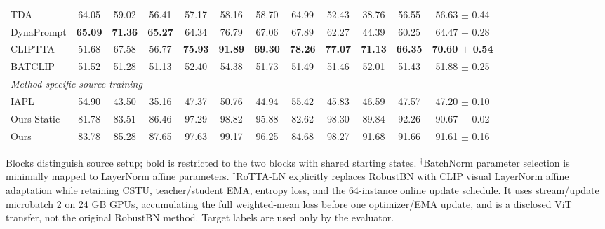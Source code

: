 \begin{table}[t]
{\begin{tabular}{lccccccccccc}
TDA & 64.05 & 59.02 & 56.41 & 57.17 & 58.16 & 58.70 & 64.99 & 52.43 & 38.76 & 56.55 & 56.63 $\pm$ 0.44 \\
DynaPrompt & \textbf{65.09} & \textbf{71.36} & \textbf{65.27} & 64.34 & 76.79 & 67.06 & 67.89 & 62.27 & 44.39 & 60.25 & 64.47 $\pm$ 0.28 \\
CLIPTTA & 51.68 & 67.58 & 56.77 & \textbf{75.93} & \textbf{91.89} & \textbf{69.30} & \textbf{78.26} & \textbf{77.07} & \textbf{71.13} & \textbf{66.35} & \textbf{70.60 $\pm$ 0.54} \\
BATCLIP & 51.52 & 51.28 & 51.13 & 52.40 & 54.38 & 51.73 & 51.49 & 51.46 & 52.01 & 51.43 & 51.88 $\pm$ 0.25 \\
\midrule
\multicolumn{12}{l}{\textit{Method-specific source training}} \\
IAPL & 54.90 & 43.50 & 35.16 & 47.37 & 50.76 & 44.94 & 55.42 & 45.83 & 46.59 & 47.57 & 47.20 $\pm$ 0.10 \\
Ours-Static & 81.78 & 83.51 & 86.46 & 97.29 & 98.82 & 95.88 & 82.62 & 98.30 & 89.84 & 92.26 & 90.67 $\pm$ 0.02 \\
Ours & 83.78 & 85.28 & 87.65 & 97.63 & 99.17 & 96.25 & 84.68 & 98.27 & 91.68 & 91.66 & 91.61 $\pm$ 0.16 \\
\bottomrule
\end{tabular}%
}
\vspace{2pt}
\parbox{\textwidth}{\footnotesize Blocks distinguish source setup; bold is restricted to the two blocks with shared starting states. $^{\dagger}$BatchNorm parameter selection is minimally mapped to LayerNorm affine parameters. $^{\ddagger}$RoTTA-LN explicitly replaces RobustBN with CLIP visual LayerNorm affine adaptation while retaining CSTU, teacher/student EMA, entropy loss, and the 64-instance online update schedule. It uses stream/update microbatch 2 on 24 GB GPUs, accumulating the full weighted-mean loss before one optimizer/EMA update, and is a disclosed ViT transfer, not the original RobustBN method. Target labels are used only by the evaluator.}
\end{table}
